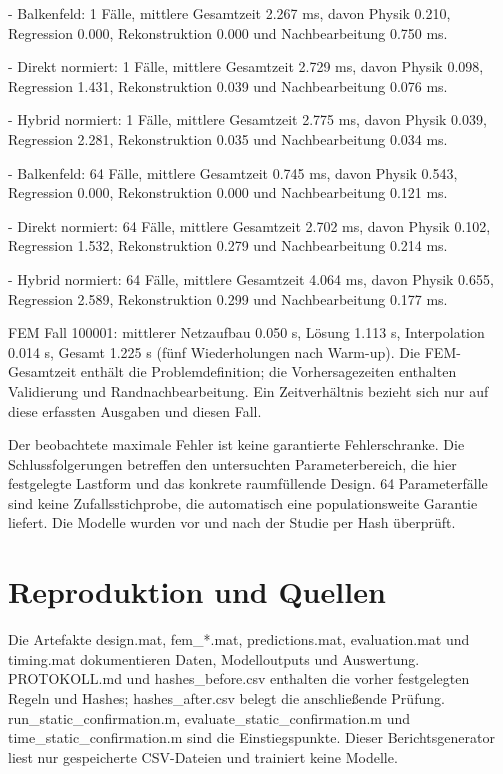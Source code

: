 \documentclass[11pt,a4paper]{article}
\begin{document}
- Balkenfeld: 1 Fälle, mittlere Gesamtzeit 2.267 ms, davon Physik 0.210, Regression 0.000, Rekonstruktion 0.000 und Nachbearbeitung 0.750 ms.

- Direkt normiert: 1 Fälle, mittlere Gesamtzeit 2.729 ms, davon Physik 0.098, Regression 1.431, Rekonstruktion 0.039 und Nachbearbeitung 0.076 ms.

- Hybrid normiert: 1 Fälle, mittlere Gesamtzeit 2.775 ms, davon Physik 0.039, Regression 2.281, Rekonstruktion 0.035 und Nachbearbeitung 0.034 ms.

- Balkenfeld: 64 Fälle, mittlere Gesamtzeit 0.745 ms, davon Physik 0.543, Regression 0.000, Rekonstruktion 0.000 und Nachbearbeitung 0.121 ms.

- Direkt normiert: 64 Fälle, mittlere Gesamtzeit 2.702 ms, davon Physik 0.102, Regression 1.532, Rekonstruktion 0.279 und Nachbearbeitung 0.214 ms.

- Hybrid normiert: 64 Fälle, mittlere Gesamtzeit 4.064 ms, davon Physik 0.655, Regression 2.589, Rekonstruktion 0.299 und Nachbearbeitung 0.177 ms.

FEM Fall 100001: mittlerer Netzaufbau 0.050 s, Lösung 1.113 s, Interpolation 0.014 s, Gesamt 1.225 s (fünf Wiederholungen nach Warm-up). Die FEM-Gesamtzeit enthält die Problemdefinition; die Vorhersagezeiten enthalten Validierung und Randnachbearbeitung. Ein Zeitverhältnis bezieht sich nur auf diese erfassten Ausgaben und diesen Fall.

Der beobachtete maximale Fehler ist keine garantierte Fehlerschranke. Die Schlussfolgerungen betreffen den untersuchten Parameterbereich, die hier festgelegte Lastform und das konkrete raumfüllende Design. 64 Parameterfälle sind keine Zufallsstichprobe, die automatisch eine populationsweite Garantie liefert. Die Modelle wurden vor und nach der Studie per Hash überprüft.

\section{Reproduktion und Quellen}
Die Artefakte design.mat, fem\_*.mat, predictions.mat, evaluation.mat und timing.mat dokumentieren Daten, Modelloutputs und Auswertung. PROTOKOLL.md und hashes\_before.csv enthalten die vorher festgelegten Regeln und Hashes; hashes\_after.csv belegt die anschließende Prüfung. run\_static\_confirmation.m, evaluate\_static\_confirmation.m und time\_static\_confirmation.m sind die Einstiegspunkte. Dieser Berichtsgenerator liest nur gespeicherte CSV-Dateien und trainiert keine Modelle.
\end{document}
